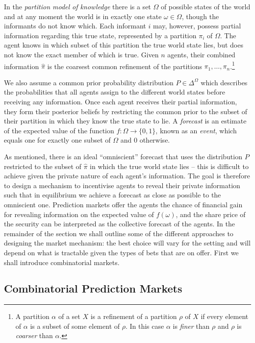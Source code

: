 In the \emph{partition model of knowledge} there is a set $\Omega$ of possible
states of the world and at any moment the world is in exactly one state $\omega
\in \Omega$, though the informants do not know which. Each informant $i$ may,
however, possess partial information regarding this true state, represented by
a partition $\pi_i$ of $\Omega$. The agent knows in which subset of this
partition the true world state lies, but does not know the exact member of
which is true. Given $n$ agents, their combined information $\hat{\pi}$ is the
coarsest common refinement of the partitions $\pi_1, \ldots, \pi_n$.\footnote{A
partition $\alpha$ of a set $X$ is a refinement of a partition $\rho$ of $X$ if
every element of $\alpha$ is a subset of some element of $\rho$. In this case
$\alpha$ is \emph{finer} than $\rho$ and $\rho$ is \emph{coarser} than
$\alpha$.}

We also assume a common prior probability distribution $P \in \Delta^{\Omega}$
which describes the probabilities that all agents assign to the different world
states before receiving any information. Once each agent receives their partial
information, they form their posterior beliefs by restricting the common prior
to the subset of their partition in which they know the true state to lie.  A
\emph{forecast} is an estimate of the expected value of the function $f :
\Omega \rightarrow \{0,1\}$, known as an \emph{event}, which equals one for
exactly one subset of $\Omega$ and 0 otherwise.

As mentioned, there is an ideal ``omniscient'' forecast that uses the
distribution $P$ restricted to the subset of $\hat{\pi}$ in which the true
world state lies -- this is difficult to achieve given the private nature of
each agent's information. The goal is therefore to design a mechanism to
incentivise agents to reveal their private information such that in equilibrium
we achieve a forecast as close as possible to the omniscient one. Prediction
markets offer the agents the chance of financial gain for revealing information
on the expected value of $f(\omega)$, and the share price of the security can
be interpreted as the collective forecast of the agents. In the remainder of
the section we shall outline some of the different approaches to designing the
market mechanism: the best choice will vary for the setting and will depend on
what is tractable given the types of bets that are on offer. First we shall
introduce combinatorial markets.

\subsection{Combinatorial Prediction Markets}

